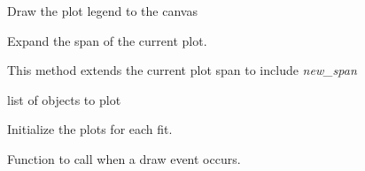 \documentclass[a4paper,10pt,english]{sphinxmanual}
\begin{document}
\begin{fulllineitems}
\begin{fulllineitems}
\begin{quote}
\begin{description}
\begin{itemize}
\end{itemize}

\end{description}\end{quote}

\end{fulllineitems}


\begin{fulllineitems}
\label{index:kafe.plot.Plot.draw_legend}
Draw the plot legend to the canvas

\end{fulllineitems}


\begin{fulllineitems}
\label{index:kafe.plot.Plot.extend_span}
Expand the span of the current plot.

This method extends the current plot span to include \emph{new\_span}

\end{fulllineitems}


\begin{fulllineitems}
\label{index:kafe.plot.Plot.fits}
list of  objects to plot

\end{fulllineitems}


\begin{fulllineitems}
\label{index:kafe.plot.Plot.init_plots}
Initialize the plots for each fit.

\end{fulllineitems}


\begin{fulllineitems}
\label{index:kafe.plot.Plot.on_draw}
Function to call when a draw event occurs.

\end{fulllineitems}


\end{fulllineitems}
\end{document}
